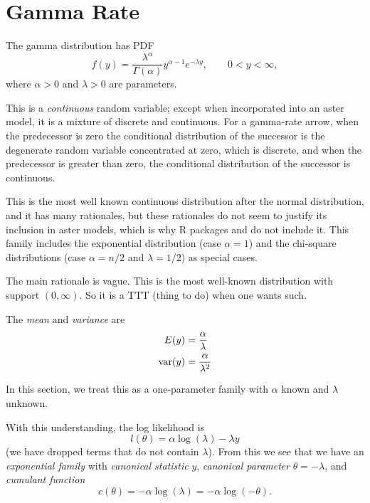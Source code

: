 \section{Gamma Rate}

The gamma distribution has PDF
\begin{equation} \label{eq:gamma-pdf}
   f(y) = \frac{\lambda^\alpha}{\Gamma(\alpha)} y^{\alpha - 1} e^{- \lambda y},
   \qquad 0 < y < \infty,
\end{equation}
where $\alpha > 0$ and $\lambda > 0$ are parameters.

This is a \emph{continuous} random variable;
except when incorporated into an aster model, it is a mixture of discrete
and continuous.  For a gamma-rate arrow, when the predecessor is zero
the conditional distribution of the successor is the degenerate random variable
concentrated at zero, which is discrete, and when the predecessor is greater
than zero, the conditional distribution of the successor is continuous.

This is the most well known continuous distribution after
the normal distribution, and it has many rationales, but these rationales
do not seem to justify its inclusion in aster models, which is why
R packages  and  do not include it.
This family includes the exponential distribution (case $\alpha = 1$)
and the chi-square distributions (case $\alpha = n / 2$ and $\lambda = 1 / 2$)
as special cases.

The main rationale is vague.  This is the most well-known distribution
with support $(0, \infty)$.  So it is a TTT (thing to do) when one wants such.

The \emph{mean} and \emph{variance} are
\begin{subequations}
\begin{align}
   E(y) & = \frac{\alpha}{\lambda}
   \label{eq:gamma-mean}
   \\
   \operatorname{var}(y) & = \frac{\alpha}{\lambda^2}
   \label{eq:gamma-var}
\end{align}
\end{subequations}

In this section, we treat this as a one-parameter family
with $\alpha$ known and $\lambda$ unknown.

With this understanding, the log likelihood is
$$
   l(\theta)
   = 
   \alpha \log(\lambda) - \lambda y
$$
(we have dropped terms that do not contain $\lambda$).
From this we see that we have an \emph{exponential family} with
\emph{canonical statistic} $y$,
\emph{canonical parameter} $\theta = - \lambda$, and
\emph{cumulant function}
\begin{equation} \label{eq:cumfun-gamma-rate}
   c(\theta) = - \alpha \log(\lambda) = - \alpha \log(- \theta).
\end{equation}

